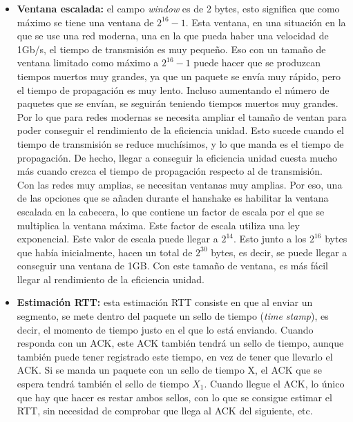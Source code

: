 \documentclass[a4paper,11pt]{article}
\begin{document}
\begin{itemize}
\item \textbf{Ventana escalada:} el campo \textit{window} es de 2 bytes, esto significa que como máximo se tiene una ventana de $2^{16}-1$. Esta ventana, en una situación en la que se use una red moderna, una en la que pueda haber una velocidad de 1Gb/s, el tiempo de transmisión es muy pequeño. Eso con un tamaño de ventana limitado como máximo a $2^{16}-1$ puede hacer que se produzcan tiempos muertos muy grandes, ya que un paquete se envía muy rápido, pero el tiempo de propagación es muy lento. Incluso aumentando el número de paquetes que se envían, se seguirán teniendo tiempos muertos muy grandes. \\

Por lo que para redes modernas se necesita ampliar el tamaño de ventan para poder conseguir el rendimiento de la eficiencia unidad. Esto sucede cuando el tiempo de transmisión se reduce muchísimos, y lo que manda es el tiempo de propagación. De hecho, llegar a conseguir la eficiencia unidad cuesta mucho más cuando crezca el tiempo de propagación respecto al de transmisión. \\

Con las redes muy amplias, se necesitan ventanas muy amplias. Por eso, una de las opciones que se añaden durante el hanshake es habilitar la ventana escalada en la cabecera, lo que contiene un factor de escala por el que se multiplica la ventana máxima. Este factor de escala utiliza una ley exponencial. Este valor de escala puede llegar a $2^{14}$. Esto junto a los $2^16$ bytes que había inicialmente, hacen un total de $2^{30}$ bytes, es decir, se puede llegar a conseguir una ventana de 1GB. Con este tamaño de ventana, es más fácil llegar al rendimiento de la eficiencia unidad. 

\item \textbf{Estimación RTT:} esta estimación RTT consiste en que al enviar un segmento, se mete dentro del paquete un sello de tiempo (\textit{time stamp}), es decir, el momento de tiempo justo en el que lo está enviando. Cuando responda con un ACK, este ACK también tendrá un sello de tiempo, aunque también puede tener registrado este tiempo, en vez de tener que llevarlo el ACK. Si se manda un paquete con un sello de tiempo X, el ACK que se espera tendrá también el sello de tiempo $X_1$. Cuando llegue el ACK, lo único que hay que hacer es restar ambos sellos, con lo que se consigue estimar el RTT, sin necesidad de comprobar que llega al ACK del siguiente, etc. \\


\end{itemize}
\end{document}
